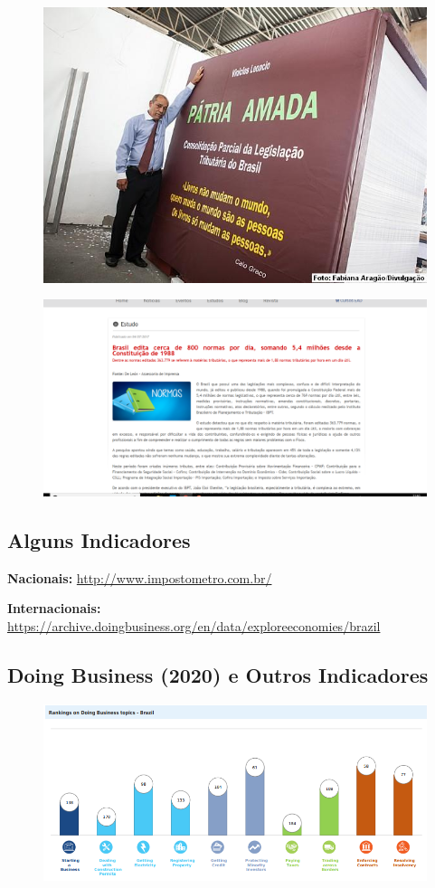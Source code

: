 \documentclass[a4paper,12pt]{article}[abntex2]
\begin{document}
\begin{figure}[H]
    \centering
    \includegraphics[width=0.7\linewidth]{Imagens/a18i1.png}
\end{figure}

\begin{figure}[H]
    \centering
    \includegraphics[width=0.7\linewidth]{Imagens/a18i2.png}
\end{figure}

\subsection{\textbf{Alguns Indicadores}}
\textbf{Nacionais:} \url{http://www.impostometro.com.br/}

\textbf{Internacionais:} \url{https://archive.doingbusiness.org/en/data/exploreeconomies/brazil}

\subsection{\textbf{Doing Business (2020) e Outros Indicadores}}
\begin{figure}[H]
    \centering
    \includegraphics[width=0.7\linewidth]{Imagens/a18i3.png}
\end{figure}
\end{document}
